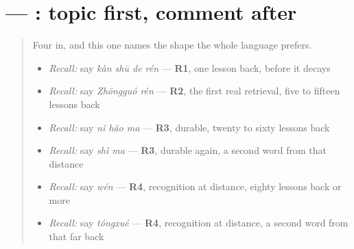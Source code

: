\section[\texorpdfstring{\zh{汉语} — \zh{我看书} (Hànyǔ, wǒ kàn shū)}{汉语 — 我看书 (Hànyǔ, wǒ kàn shū)}]{ — : topic first, comment after}

\label{lesson:ZH-C23-huati}



\begin{quote}
Four in, and this one names the shape the whole language prefers.

\begin{itemize}
\raggedright
  \item \emph{Recall:} say \emph{kàn shū de rén} — \textbf{R1}, one lesson back, before it decays
  \item \emph{Recall:} say \emph{Zhōngguó rén} — \textbf{R2}, the first real retrieval, five to fifteen lessons back
  \item \emph{Recall:} say \emph{nǐ hǎo ma} — \textbf{R3}, durable, twenty to sixty lessons back
  \item \emph{Recall:} say \emph{shì ma} — \textbf{R3}, durable again, a second word from that distance
  \item \emph{Recall:} say \emph{wén} — \textbf{R4}, recognition at distance, eighty lessons back or more
  \item \emph{Recall:} say \emph{tóngxué} — \textbf{R4}, recognition at distance, a second word from that far back
\end{itemize}
\end{quote}

